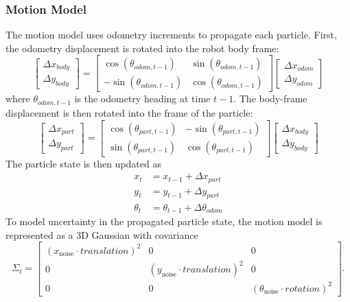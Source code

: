 \documentclass[11pt]{article}
\begin{document}
\subsubsection{Motion Model}

The motion model uses odometry increments to propagate each particle. First, the odometry displacement is rotated into
the robot body frame:
\begin{equation*}
\begin{bmatrix}
\Delta x_{body}\\
\Delta y_{body}
\end{bmatrix}
=
\begin{bmatrix}
\cos(\theta_{odom,t-1}) & \sin(\theta_{odom,t-1})\\
-\sin(\theta_{odom,t-1}) & \cos(\theta_{odom,t-1})
\end{bmatrix}
\begin{bmatrix}
\Delta x_{odom}\\
\Delta y_{odom}
\end{bmatrix}
\end{equation*}
\noindent where \(\theta_{odom,t-1}\) is the odometry heading at time \(t-1\). The body-frame displacement is then
          rotated into the frame of the particle:
\begin{equation*}
\begin{bmatrix}
\Delta x_{part}\\
\Delta y_{part}
\end{bmatrix}
=
\begin{bmatrix}
\cos(\theta_{part,t-1}) & -\sin(\theta_{part,t-1})\\
\sin(\theta_{part,t-1}) & \cos(\theta_{part,t-1})
\end{bmatrix}
\begin{bmatrix}
\Delta x_{body}\\
\Delta y_{body}
\end{bmatrix}
\end{equation*}
\noindent The particle state is then updated as
\begin{align*}
x_t &= x_{t-1} + \Delta x_{part} \\
y_t &= y_{t-1} + \Delta y_{part} \\
\theta_t &= \theta_{t-1} + \Delta \theta_{odom}
\end{align*}
\noindent To model uncertainty in the propagated particle state, the motion model is represented as a 3D Gaussian with
          covariance
\[
\Sigma_t =
\begin{bmatrix}
(x_{\text{noise}}\cdot translation)^2 & 0 & 0\\
0 & (y_{\text{noise}}\cdot translation)^2 & 0\\
0 & 0 & (\theta_{\text{noise}}\cdot rotation)^2
\end{bmatrix}.
\]
\end{document}
